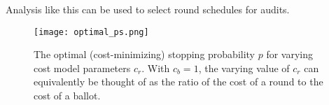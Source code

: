 Analysis like this can be used to select round schedules for audits. 


\begin{figure}
\texttt{[image: optimal\_ps.png]}
\caption{The optimal (cost-minimizing) stopping probability $p$ for varying cost model parameters $c_r$. With $c_b=1$, the varying value of $c_r$ can equivalently be thought of as the ratio of the cost of a round to the cost of a ballot.}
\label{fig:optimal_ps}
\end{figure}







